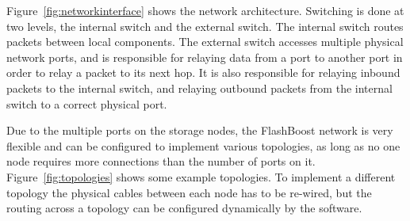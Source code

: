 Figure~\ref{fig:networkinterface} shows the network architecture. Switching is
done at two levels, the internal switch and the external switch.  The internal
switch routes packets between local components.  The external switch accesses
multiple physical network ports, and is responsible for relaying data from a
port to another port in order to relay a packet to its next hop. It is also
responsible for relaying inbound packets to the internal
switch, and relaying outbound packets from the internal switch to a correct
physical port. 

Due to the multiple ports on the storage nodes, the FlashBoost network is very
flexible and can be configured to implement various topologies, as long as no
one node requires more connections than the number of ports on it.
Figure~\ref{fig:topologies} shows some example topologies. To implement a
different topology the physical cables between each node has to be re-wired, but
the routing across a topology can be configured dynamically by the software.


